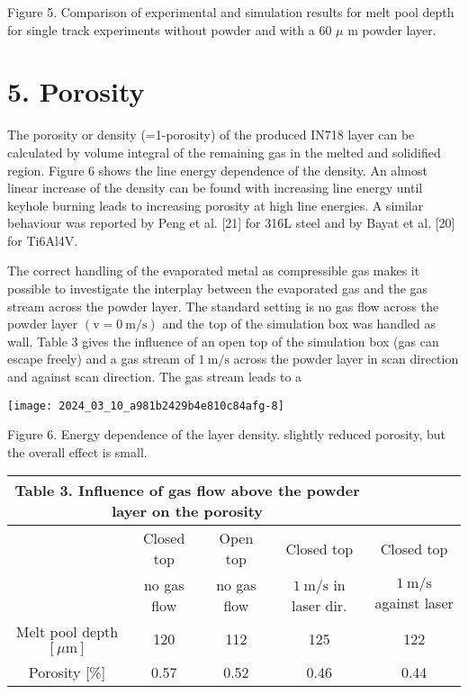 \documentclass[10pt]{article}
\begin{document}
Figure 5. Comparison of experimental and simulation results for melt pool depth for single track experiments without powder and with a 60 $\mu$ m powder layer.

\section*{5. Porosity}
The porosity or density (=1-porosity) of the produced IN718 layer can be calculated by volume integral of the remaining gas in the melted and solidified region. Figure 6 shows the line energy dependence of the density. An almost linear increase of the density can be found with increasing line energy until keyhole burning leads to increasing porosity at high line energies. A similar behaviour was reported by Peng et al. [21] for 316L steel and by Bayat et al. [20] for Ti6Al4V.

The correct handling of the evaporated metal as compressible gas makes it possible to investigate the interplay between the evaporated gas and the gas stream across the powder layer. The standard setting is no gas flow across the powder layer $(\mathrm{v}=0 \mathrm{~m} / \mathrm{s})$ and the top of the simulation box was handled as wall. Table 3 gives the influence of an open top of the simulation box (gas can escape freely) and a gas stream of $1 \mathrm{~m} / \mathrm{s}$ across the powder layer in scan direction and against scan direction. The gas stream leads to a

\begin{center}
\texttt{[image: 2024\_03\_10\_a981b2429b4e810c84afg-8]}
\end{center}

Figure 6. Energy dependence of the layer density. slightly reduced porosity, but the overall effect is small.

\begin{center}
\begin{tabular}{ccccc}
\hline
\multicolumn{4}{c}{Table 3. Influence of gas flow above the powder layer on the porosity} &  \\
\hline
 & Closed top & Open top & Closed top & Closed top \\
 & no gas flow & no gas flow & $1 \mathrm{~m} / \mathrm{s}$ in laser dir. & $1 \mathrm{~m} / \mathrm{s}$ against laser \\
\hline
Melt pool depth $[\mu \mathrm{m}]$ & 120 & 112 & 125 & 122 \\
Porosity [\%] & 0.57 & 0.52 & 0.46 & 0.44 \\
\hline
\end{tabular}
\end{center}
\end{document}

